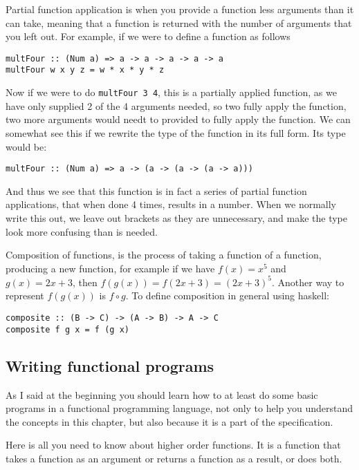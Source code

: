   \noindent
  Partial function application is when you provide a function less arguments than it can take, meaning that a function is returned with the number of arguments that you left out. For example, if we were to define a function as follows
\begin{verbatim}multFour :: (Num a) => a -> a -> a -> a -> a
multFour w x y z = w * x * y * z\end{verbatim}
  Now if we were to  do \verb|multFour 3 4|, this is a partially applied function, as we have only supplied 2 of the 4 arguments needed, so two fully apply the function, two more arguments would needt to provided to fully apply the function. We can somewhat see this if we rewrite the type of the function in its full form. Its type would be:
\begin{verbatim}multFour :: (Num a) => a -> (a -> (a -> (a -> a)))\end{verbatim}
 And thus we see that this function is in fact a series of partial function applications, that when done 4 times, results in a number. When we normally write this out, we leave out brackets as they are unnecessary, and make the type look more confusing than is needed.
 

  \noindent
  Composition of functions, is the process of taking a function of a function, producing a new function, for example if we have $f(x)=x^5$ and $g(x)=2x+3$, then $f(g(x)) = f(2x+3) = (2x+3)^5$. Another way to represent $f(g(x))$ is $f \circ g$. To define composition in general using haskell:
  \begin{verbatim}composite :: (B -> C) -> (A -> B) -> A -> C
composite f g x = f (g x)\end{verbatim}

\subsection{Writing functional programs}

  \noindent
  As I said at the beginning you should learn how to at least do some basic programs in a functional programming language, not only to help you understand the concepts in this chapter, but also because it is a part of the specification.
  
  Here is all you need to know about higher order functions. It is a function that takes a function as an argument or returns a function as a result, or does both.
  

